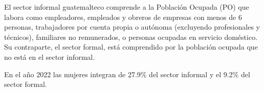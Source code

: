 El sector informal guatemalteco comprende a la Población Ocupada (PO) que labora como empleadores, empleados y obreros de empresas con menos de 6 personas, trabajadores por cuenta propia o autónoma (excluyendo profesionales y técnicos), familiares no remunerados, o personas ocupadas en servicio doméstico. Su contraparte, el sector formal, está comprendido por la población ocupada que no está en el sector informal. 

En el año 2022 las mujeres integran de 27.9\% del sector informal y el 9.2\% del sector formal. 